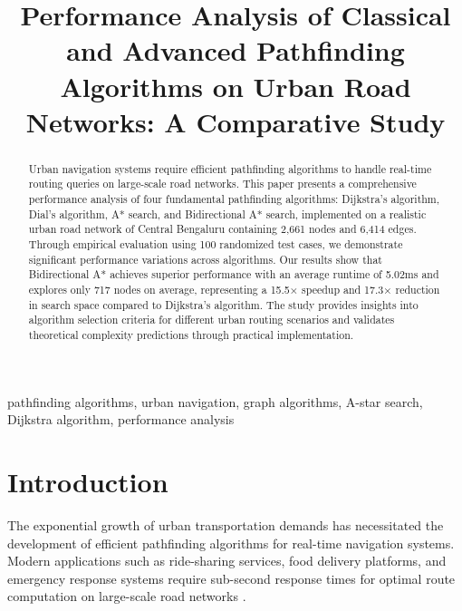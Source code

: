 \documentclass[conference]{IEEEtran}
\begin{document}
\title{Performance Analysis of Classical and Advanced Pathfinding Algorithms on Urban Road Networks: A Comparative Study}

\author{
}

\maketitle

\begin{abstract}
Urban navigation systems require efficient pathfinding algorithms to handle real-time routing queries on large-scale road networks. This paper presents a comprehensive performance analysis of four fundamental pathfinding algorithms: Dijkstra's algorithm, Dial's algorithm, A* search, and Bidirectional A* search, implemented on a realistic urban road network of Central Bengaluru containing 2,661 nodes and 6,414 edges. Through empirical evaluation using 100 randomized test cases, we demonstrate significant performance variations across algorithms. Our results show that Bidirectional A* achieves superior performance with an average runtime of 5.02ms and explores only 717 nodes on average, representing a 15.5× speedup and 17.3× reduction in search space compared to Dijkstra's algorithm. The study provides insights into algorithm selection criteria for different urban routing scenarios and validates theoretical complexity predictions through practical implementation.
\end{abstract}

\begin{IEEEkeywords}
pathfinding algorithms, urban navigation, graph algorithms, A-star search, Dijkstra algorithm, performance analysis
\end{IEEEkeywords}

\section{Introduction}

The exponential growth of urban transportation demands has necessitated the development of efficient pathfinding algorithms for real-time navigation systems. Modern applications such as ride-sharing services, food delivery platforms, and emergency response systems require sub-second response times for optimal route computation on large-scale road networks \cite{dijkstra1959note}.
\end{document}
